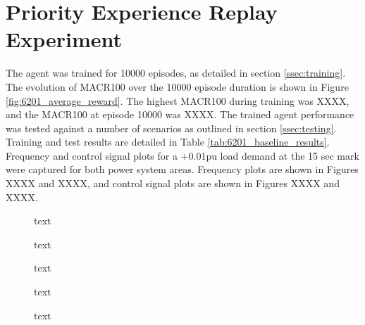 \section{Priority Experience Replay Experiment}
The agent was trained for 10000 episodes, as detailed in section \ref{ssec:training}. The evolution of MACR100 over the 10000 episode duration is shown in Figure \ref{fig:6201_average_reward}. The highest MACR100 during training was XXXX, and the MACR100 at episode 10000 was XXXX. The trained agent performance was tested against a number of scenarios as outlined in section \ref{ssec:testing}. Training and test results are detailed in Table \ref{tab:6201_baseline_results}. Frequency and control signal plots for a +0.01pu load demand at the 15 sec mark were captured for both power system areas. Frequency plots are shown in Figures XXXX and XXXX, and control signal plots are shown in Figures XXXX and XXXX.

\vspace{2cm}

\begin{figure}[h]
	\centering
	
	\caption{text}
\end{figure}





\begin{figure}[h]
	\centering
	
	
	\caption{text}
	
	
	\caption{text}
	
	
	\caption{text}
		
	
	\caption{text}
\end{figure}